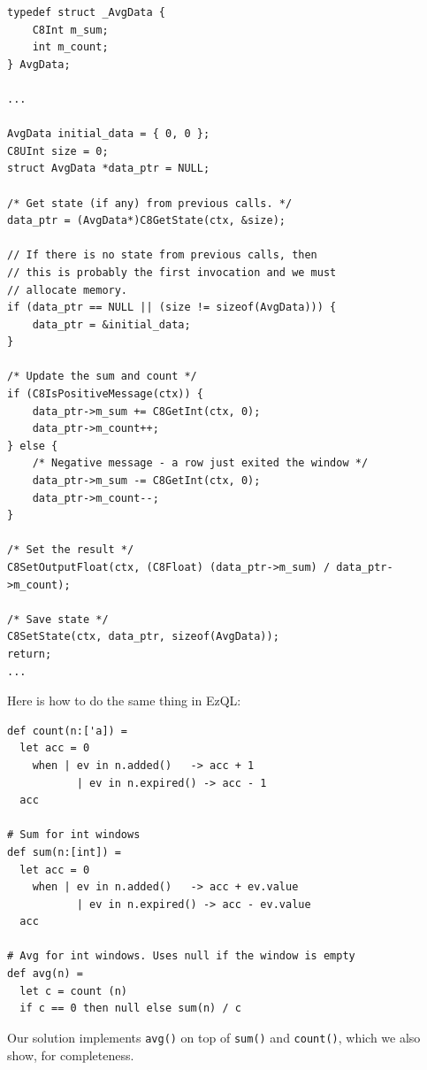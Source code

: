 \begin{lstlisting}
typedef struct _AvgData {
    C8Int m_sum;
    int m_count;
} AvgData;

...

AvgData initial_data = { 0, 0 };
C8UInt size = 0;
struct AvgData *data_ptr = NULL;

/* Get state (if any) from previous calls. */
data_ptr = (AvgData*)C8GetState(ctx, &size);

// If there is no state from previous calls, then
// this is probably the first invocation and we must
// allocate memory.
if (data_ptr == NULL || (size != sizeof(AvgData))) {
    data_ptr = &initial_data;
}

/* Update the sum and count */
if (C8IsPositiveMessage(ctx)) {
    data_ptr->m_sum += C8GetInt(ctx, 0);
    data_ptr->m_count++;
} else {
    /* Negative message - a row just exited the window */
    data_ptr->m_sum -= C8GetInt(ctx, 0);
    data_ptr->m_count--;
}

/* Set the result */
C8SetOutputFloat(ctx, (C8Float) (data_ptr->m_sum) / data_ptr->m_count);

/* Save state */
C8SetState(ctx, data_ptr, sizeof(AvgData));
return;
...
\end{lstlisting}

Here is how to do the same thing in EzQL:



\begin{lstlisting}
def count(n:['a]) =
  let acc = 0
    when | ev in n.added()   -> acc + 1
           | ev in n.expired() -> acc - 1
  acc

# Sum for int windows
def sum(n:[int]) =
  let acc = 0
    when | ev in n.added()   -> acc + ev.value
           | ev in n.expired() -> acc - ev.value
  acc

# Avg for int windows. Uses null if the window is empty
def avg(n) =
  let c = count (n)
  if c == 0 then null else sum(n) / c
\end{lstlisting}

Our solution implements \verb=avg()= on top of \verb=sum()= and
\verb=count()=, which we also show, for completeness.

